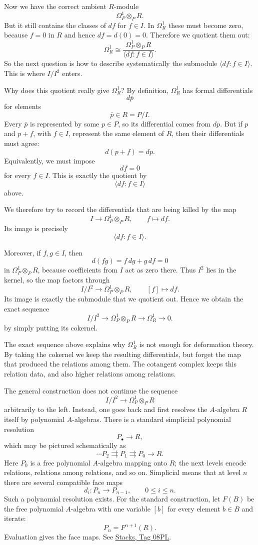 Now we have the correct ambient $R$-module
$$
\Omega^1_P\otimes_P R.
$$
But it still contains the classes of $df$ for $f\in I$. In $\Omega^1_R$ these must become zero, because $f=0$ in $R$ and hence $df=d(0)=0$. Therefore we quotient them out:
$$
\Omega^1_R\cong
\frac{\Omega^1_P\otimes_P R}
{\langle df:f\in I\rangle}.
$$
So the next question is how to describe systematically the submodule $\langle df:f\in I\rangle$. This is where $I/I^2$ enters.

Why does this quotient really give $\Omega^1_R$? By definition, $\Omega^1_R$ has formal differentials
$$
d\bar p
$$
for elements
$$
\bar p\in R=P/I.
$$
Every $\bar p$ is represented by some $p\in P$, so its differential comes from $dp$. But if $p$ and $p+f$, with $f\in I$, represent the same element of $R$, then their differentials must agree:
$$
d(p+f)=dp.
$$
Equivalently, we must impose
$$
df=0
$$
for every $f\in I$. This is exactly the quotient by
$$
\langle df:f\in I\rangle
$$
above.

We therefore try to record the differentials that are being killed by the map
$$
I\longrightarrow\Omega^1_P\otimes_P R,
\qquad f\longmapsto df.
$$
Its image is precisely
$$
\langle df:f\in I\rangle.
$$

Moreover, if $f,g\in I$, then
$$
d(fg)=f\,dg+g\,df=0
$$
in $\Omega^1_P\otimes_P R$, because coefficients from $I$ act as zero there. Thus $I^2$ lies in the kernel, so the map factors through
$$
I/I^2\longrightarrow\Omega^1_P\otimes_P R,
\qquad [f]\longmapsto df.
$$
Its image is exactly the submodule that we quotient out. Hence we obtain the exact sequence
$$
I/I^2\longrightarrow
\Omega^1_P\otimes_P R\longrightarrow
\Omega^1_R\longrightarrow0.
$$
by simply putting its cokernel.

\noindent
The exact sequence above explains why
$\Omega^1_R$ is not enough for deformation
theory. By taking the cokernel we keep the
resulting differentials, but forget the map
that produced the relations among them.
The cotangent complex keeps this relation
data, and also higher relations among
relations.

\begin{remark}
\label{remark-polynomial-resolution-cotangent}
The general construction does not continue
the sequence
$$
I/I^2\longrightarrow
\Omega^1_P\otimes_P R
$$
arbitrarily to the left. Instead, one goes
back and first resolves the $A$-algebra
$R$ itself by polynomial $A$-algebras.
There is a standard simplicial polynomial
resolution
$$
P_\bullet\longrightarrow R,
$$
which may be pictured schematically as
$$
\cdots P_2
\rightrightarrows P_1
\rightrightarrows P_0
\longrightarrow R.
$$
Here $P_0$ is a free polynomial
$A$-algebra mapping onto $R$; the next
levels encode relations, relations among
relations, and so on. Simplicial means
that at level $n$ there are several
compatible face maps
$$
d_i:P_n\longrightarrow P_{n-1},
\qquad 0\leq i\leq n.
$$
Such a polynomial resolution exists. For
the standard construction, let $F(B)$ be
the free polynomial $A$-algebra with one
variable $[b]$ for every element $b\in B$
and iterate:
$$
P_n=F^{n+1}(R).
$$
Evaluation gives the face maps. See
\href{https://stacks.math.columbia.edu/%
tag/08PL}{Stacks, Tag 08PL}.
\end{remark}

